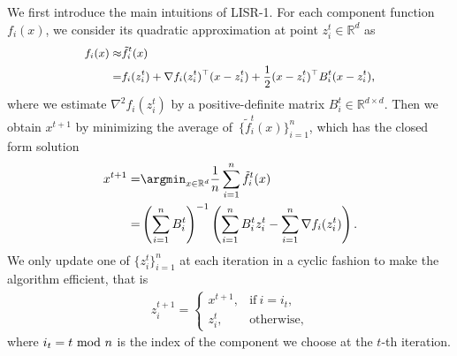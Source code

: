 \documentclass[letterpaper]{article} %
\theoremstyle{plain}
\theoremstyle{definition}
\theoremstyle{remark}
\def\BR{{\mathbb{R}}}
\begin{document}
We first introduce the main intuitions of LISR-1.
For each component function $f_i(x)$, we consider its quadratic approximation at point $z_i^t\in\BR^d$ as
\begin{align*}
\small\begin{split}    
f_i(x) \approx & {\tilde f}_i^t(x) \\
= & f_i (z_i^t) + \nabla f_i (z_i^t)^{\top} (x - z_i^t) + \frac{1}{2}(x- z_i^t)^{\top} B_i^t (x - z_i^t),
\end{split}
\end{align*}
where we estimate $\nabla^2 f_i(z_i^t)$ by a positive-definite matrix $B_i^t\in\BR^{d\times d}$.
Then we obtain $x^{t+1}$ by minimizing the average of~$\{\tilde f_i^t(x)\}_{i=1}^n$, which has the closed form solution
\begin{align}\label{cur_iter_update}
\begin{split}    
    x^{t+1} =& \argmin_{x\in\BR^d} \frac{1}{n}\sum_{i=1}^n\tilde f_i^t (x) \\
    =& \left( \sum_{i=1}^n B_{i}^{t} \right)^{-1} \left( \sum_{i=1}^n B_{i}^{t} z_{i}^{t} - \sum_{i=1}^n \nabla f_i(z_i^{t})\right).
\end{split}
\end{align}
We only update one of $\{z_i^t\}_{i=1}^n$ at each iteration
in a cyclic fashion to make the algorithm efficient, that is
\begin{align}\label{active_idx_update}
    z_i^{t+1} = \begin{cases}
        x^{t+1},  & \text{if}~ i=i_t, \\[0.1cm]
        z_i^{t},  & \text{otherwise},
    \end{cases}
\end{align}
where $i_t=t~{\rm mod}~n$ is the index of the component
we choose at the $t$-th iteration.
\end{document}
